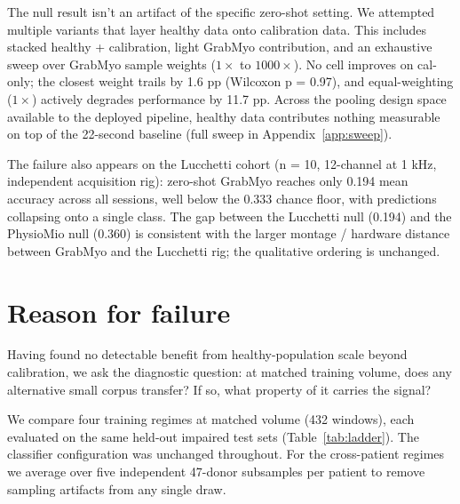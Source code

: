 \documentclass{article}
\begin{document}
The null result isn't an artifact of the specific zero-shot setting. We attempted multiple variants that layer healthy data onto calibration data. This includes stacked healthy + calibration, light GrabMyo contribution, and an exhaustive sweep over GrabMyo sample weights ($1\times$ to $1000\times$). No cell improves on cal-only; the closest weight trails by 1.6 pp (Wilcoxon p = 0.97), and equal-weighting ($1\times$) actively degrades performance by 11.7 pp. Across the pooling design space available to the deployed pipeline, healthy data contributes nothing measurable on top of the 22-second baseline (full sweep in Appendix~\ref{app:sweep}).

The failure also appears on the Lucchetti cohort (n = 10, 12-channel at 1 kHz, independent acquisition rig): zero-shot GrabMyo reaches only 0.194 mean accuracy across all sessions, well below the 0.333 chance floor, with predictions collapsing onto a single class. The gap between the Lucchetti null (0.194) and the PhysioMio null (0.360) is consistent with the larger montage / hardware distance between GrabMyo and the Lucchetti rig; the qualitative ordering is unchanged.

\section{Reason for failure}

Having found no detectable benefit from healthy-population scale beyond calibration, we ask the diagnostic question: at matched training volume, does any alternative small corpus transfer? If so, what property of it carries the signal?

We compare four training regimes at matched volume (432 windows), each evaluated on the same held-out impaired test sets (Table~\ref{tab:ladder}). The classifier configuration was unchanged throughout. For the cross-patient regimes we average over five independent 47-donor subsamples per patient to remove sampling artifacts from any single draw.
\end{document}
